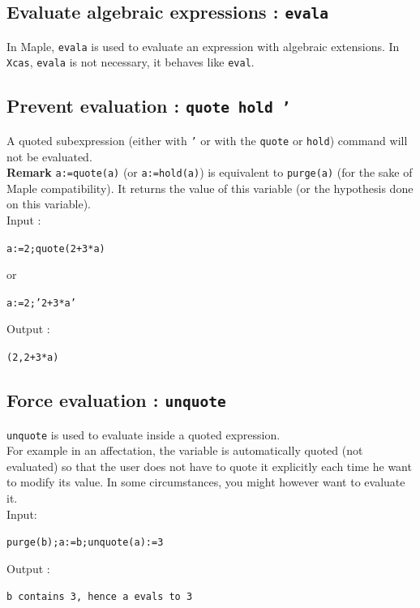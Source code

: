 \documentclass[a4paper,11pt]{book}
\begin{document}
\subsection{Evaluate algebraic expressions : {\tt evala}}
\noindent  In Maple, {\tt evala} is used to evaluate an expression with
algebraic extensions. In {\tt Xcas}, {\tt evala} is not necessary, it
behaves like {\tt eval}.\\

\subsection{Prevent evaluation : {\tt quote hold '}}
A quoted subexpression (either with {\tt '} or with the 
{\tt quote} or {\tt hold}) command will not be evaluated.\\
{\bf Remark}
{\tt a:=quote(a)} (or {\tt a:=hold(a)}) is equivalent to {\tt purge(a)} 
(for the sake of Maple compatibility). It returns 
the value of this variable (or the hypothesis done on this variable). \\
Input :
\begin{center}{\tt a:=2;quote(2+3*a)}\end{center}
or
\begin{center}{\tt a:=2;'2+3*a'}\end{center}
Output :
\begin{center}{\tt (2,2+3*a)}\end{center}

\subsection{Force evaluation : {\tt unquote}}
{\tt unquote} is used to evaluate inside a quoted expression.\\
For example in an affectation, the variable is automatically quoted 
(not evaluated) so that the user does not have to quote it explicitly
each time he want to modify its value. In some circumstances, you
might however want to evaluate it.
\\
Input:
\begin{center}{\tt purge(b);a:=b;unquote(a):=3}\end{center}
Output :
\begin{center}{\tt b contains 3, hence a evals to 3}\end{center}
\end{document}
